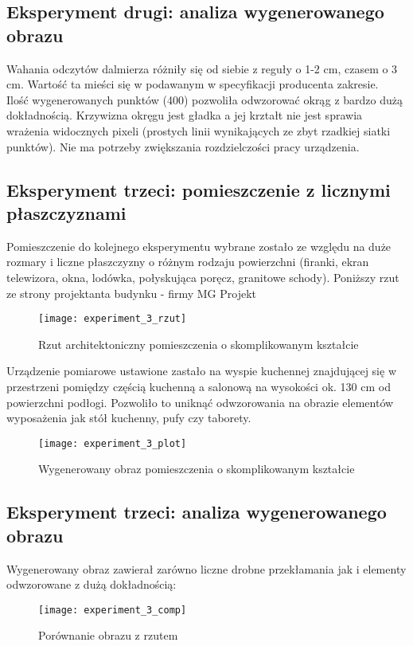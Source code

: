 \subsection {Eksperyment drugi: analiza wygenerowanego obrazu}
Wahania odczytów dalmierza różniły się od siebie z reguły o 1-2 cm, czasem o 3 cm. Wartość ta mieści się w podawanym w specyfikacji producenta zakresie.\\

Ilość wygenerowanych punktów (400) pozwoliła odwzorować okrąg z bardzo dużą dokładnością. Krzywizna okręgu jest gładka a jej krztałt nie jest sprawia wrażenia widocznych pixeli (prostych linii wynikających ze zbyt rzadkiej siatki punktów). Nie ma potrzeby zwiększania rozdzielczości pracy urządzenia.\\

\newpage
\subsection {Eksperyment trzeci: pomieszczenie z licznymi płaszczyznami}
Pomieszczenie do kolejnego eksperymentu wybrane zostało ze względu na duże rozmary i liczne płaszczyzny o różnym rodzaju powierzchni (firanki, ekran telewizora, okna, lodówka, połyskująca poręcz, granitowe schody). Poniższy rzut ze strony projektanta budynku - firmy MG Projekt \cite{helios}\\
\begin{figure}[h]
    \centering
    \texttt{[image: experiment\_3\_rzut]}
    \caption{Rzut architektoniczny pomieszczenia o skomplikowanym kształcie}
    \label{fig:experiment_3_rzut}
\end{figure}

Urządzenie pomiarowe ustawione zastało na wyspie kuchennej znajdującej się w przestrzeni pomiędzy częścią kuchenną a salonową na wysokości ok. 130 cm od powierzchni podłogi. Pozwoliło to uniknąć odwzorowania na obrazie elementów wyposażenia jak stół kuchenny, pufy czy taborety.\\
\begin{figure}[h]
    \centering
    \texttt{[image: experiment\_3\_plot]}
    \caption{Wygenerowany obraz pomieszczenia o skomplikowanym kształcie}
    \label{fig:experiment_3_plot}
\end{figure}

\newpage
\subsection {Eksperyment trzeci: analiza wygenerowanego obrazu}
Wygenerowany obraz zawierał zarówno liczne drobne przekłamania jak i elementy odwzorowane z dużą dokładnością:\\
\begin{figure}[h]
    \centering
    \texttt{[image: experiment\_3\_comp]}
    \caption{Porównanie obrazu z rzutem}
    \label{fig:experiment_3_comp}
\end{figure}

